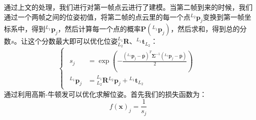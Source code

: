 \documentclass[12pt, twocolumn]{article}
\begin{document}
	通过上文的处理，我们进行对第一帧点云进行了建模。当第二帧到来的时候，我们通过一个两帧之间的位姿初值，将第二帧的点云里的每一个点${^{L_2}\boldsymbol{p}_j}$变换到第一帧坐标系中，得到${^{L_1}\boldsymbol{p}_j}$，然后计算每一个点的概率$\boldsymbol{P}({^{L_1}\boldsymbol{p}_j})$，然后求和，得到总的分数$s$。让这个分数最大即可以优化位姿$^{L_1}_{L_2}\boldsymbol{R}$、$^{L_1}\boldsymbol{t}_{L_2}$：
	\begin{equation*}
		\begin{cases}
			\begin{aligned}
					s_j&=\exp\left( -\frac{\left({^{L_1}\boldsymbol{p}_j}-\bar{\boldsymbol{p}}\right)^T\boldsymbol{\Sigma}^{-1}\left({^{L_1}\boldsymbol{p}_j}-\bar{\boldsymbol{p}}\right)}{2} \right)\\
					{^{L_1}\boldsymbol{p}_j}&={^{L_1}_{L_2}\boldsymbol{R}}{^{L_2}\boldsymbol{p}_j}+{^{L_1}\boldsymbol{t}_{L_2}}
			\end{aligned}
		\end{cases}
	\end{equation*}
	通过利用高斯-牛顿发可以优化求解位姿。首先我们的损失函数为：
	\begin{equation*}
		f(\boldsymbol{x})_j=\frac{1}{s_j}
	\end{equation*}
	
\end{document}

